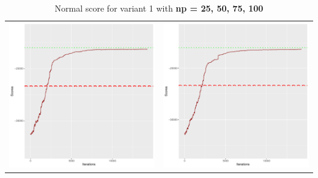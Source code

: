 \documentclass[]{scrartcl}
\begin{document}
\begin{table}[h!]
\begin{tabular}{cc}
\includegraphics[scale = 0.4]{./figs/win95pts/v1/75/boundsEvolution-14252.pdf} & 
\includegraphics[scale = 0.4]{./figs/win95pts/v1/100/boundsEvolution-14252.pdf} \\
\end{tabular}
\caption{Normal score for variant 1 with \textbf{np =  25, 50, 75, 100 }}
\end{table}
\end{document}
